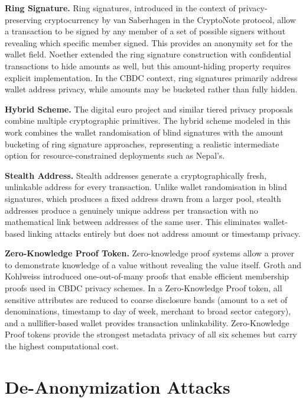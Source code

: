 \textbf{Ring Signature.} Ring signatures, introduced in the
context of privacy-preserving cryptocurrency by van Saberhagen
\cite{vansaberhagen2013} in the CryptoNote protocol,
allow a transaction to be signed by any member of a set of
possible signers without revealing which specific member
signed. This provides an anonymity set for the wallet field.
Noether \cite{noether2015} extended the ring signature
construction with confidential transactions to hide amounts
as well, but this amount-hiding property requires explicit
implementation. In the CBDC context, ring signatures
primarily address wallet address privacy, while amounts may
be bucketed rather than fully hidden.

\textbf{Hybrid Scheme.} The digital euro project and similar
tiered privacy proposals combine multiple cryptographic
primitives. The hybrid scheme modeled in this work combines
the wallet randomisation of blind signatures with the amount
bucketing of ring signature approaches, representing a
realistic intermediate option for resource-constrained
deployments such as Nepal's.

\textbf{Stealth Address.} Stealth addresses generate a
cryptographically fresh, unlinkable address for every
transaction. Unlike wallet randomisation in blind signatures,
which produces a fixed address drawn from a larger pool,
stealth addresses produce a genuinely unique address per
transaction with no mathematical link between addresses of
the same user. This eliminates wallet-based linking attacks
entirely but does not address amount or timestamp privacy.

\textbf{Zero-Knowledge Proof Token.} Zero-knowledge proof systems allow a
prover to demonstrate knowledge of a value without revealing
the value itself. Groth and Kohlweiss \cite{groth2015}
introduced one-out-of-many proofs that enable efficient
membership proofs used in CBDC privacy schemes. In a Zero-Knowledge Proof
token, all sensitive attributes are reduced to coarse
disclosure bands (amount to a set of denominations,
timestamp to day of week, merchant to broad sector category),
and a nullifier-based wallet provides transaction
unlinkability. Zero-Knowledge Proof tokens provide the strongest metadata
privacy of all six schemes but carry the highest
computational cost.

\section{De-Anonymization Attacks}
\label{sec:deanon_attacks}


